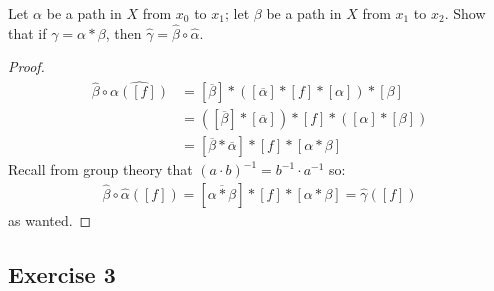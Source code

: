 \documentclass{article}
\begin{document}
Let $\alpha$ be a path in $X$ from $x_0$ to $x_1$; let $\beta$ be a path in $X$ from $x_1$ to $x_2$. Show that if $\gamma = \alpha * \beta$, then $\hat{\gamma} = \hat{\beta}\circ \hat{\alpha}$.
\begin{proof}
	\begin{align*}
		\hat{\beta} \circ \hat{\alpha([f])} &= [\overline{\beta}] * ([\overline{\alpha}] * [f] * [\alpha]) * [\beta] \\
			&= ([\overline{\beta}] * [\overline{\alpha}]) * [f] * ([\alpha] * [\beta]) \\
			&= [\overline{\beta} * \overline{\alpha}] * [f] * [\alpha * \beta]
	\end{align*}
	Recall from group theory that $(a \cdot b)^{-1} = b^{-1} \cdot a^{-1}$ so:
	\begin{align*}
		\hat{\beta} \circ \hat{\alpha}([f]) = [\overline{\alpha * \beta}] * [f] * [\alpha * \beta] = \hat{\gamma}([f])
	\end{align*}
	as wanted.
\end{proof}

\subsection*{Exercise 3}
\end{document}
